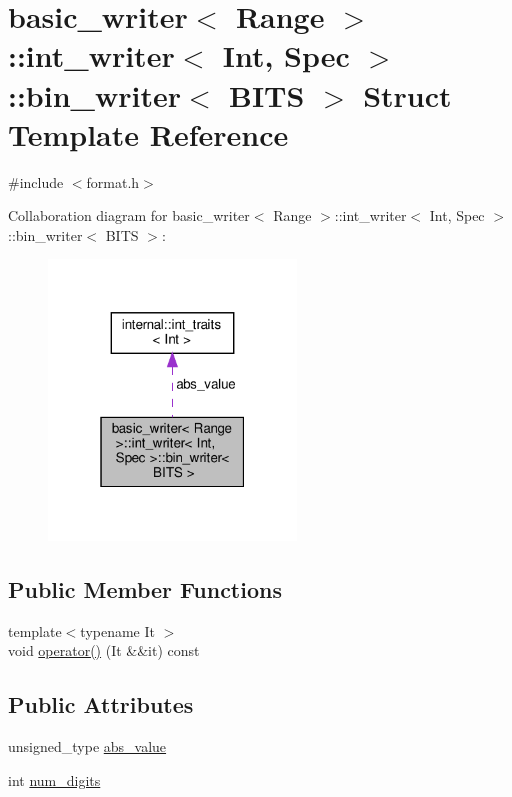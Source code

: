 \hypertarget{structbasic__writer_1_1int__writer_1_1bin__writer}{}\section{basic\+\_\+writer$<$ Range $>$\+:\+:int\+\_\+writer$<$ Int, Spec $>$\+:\+:bin\+\_\+writer$<$ B\+I\+TS $>$ Struct Template Reference}
\label{structbasic__writer_1_1int__writer_1_1bin__writer}


{\ttfamily \#include $<$format.\+h$>$}



Collaboration diagram for basic\+\_\+writer$<$ Range $>$\+:\+:int\+\_\+writer$<$ Int, Spec $>$\+:\+:bin\+\_\+writer$<$ B\+I\+TS $>$\+:
\nopagebreak
\begin{figure}[H]
\begin{center}
\leavevmode
\includegraphics[width=187pt]{structbasic__writer_1_1int__writer_1_1bin__writer__coll__graph}
\end{center}
\end{figure}
\subsection*{Public Member Functions}
\begin{DoxyCompactItemize}
\item 
{\footnotesize template$<$typename It $>$ }\\void \hyperlink{structbasic__writer_1_1int__writer_1_1bin__writer_a6e186f22c8c7407268c6ff4f888e2234}{operator()} (It \&\&it) const
\end{DoxyCompactItemize}
\subsection*{Public Attributes}
\begin{DoxyCompactItemize}
\item 
unsigned\+\_\+type \hyperlink{structbasic__writer_1_1int__writer_1_1bin__writer_a8c7736e764f844fbe64dcec0a94530dd}{abs\+\_\+value}
\item 
int \hyperlink{structbasic__writer_1_1int__writer_1_1bin__writer_abc4feafeba4c2919f9c04a1fd5ec1a1b}{num\+\_\+digits}
\end{DoxyCompactItemize}


